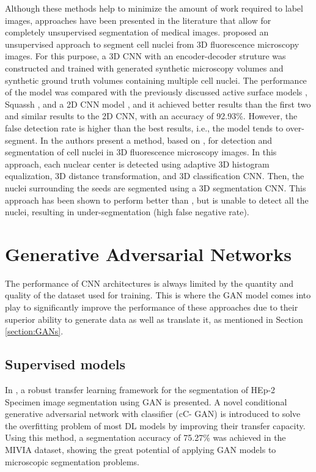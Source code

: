 Although these methods help to minimize the amount of work required to label images, approaches have been presented in the literature that allow for completely unsupervised segmentation of medical images. \citet{SOTA:3DCNN} proposed an unsupervised approach to segment cell nuclei from \ac{3D} fluorescence microscopy images. For this purpose, a \ac{3D} \ac{CNN} with an encoder-decoder struture was constructed and trained with generated synthetic microscopy volumes and synthetic ground truth volumes containing multiple cell nuclei. The performance of the model was compared with the previously discussed active surface models \cite{3D:active,active:inhmo}, Squassh \cite{squassh}, and a \ac{2D} \ac{CNN} model \cite{2dplus}, and it achieved better results than the first two and similar results to the \ac{2D} \ac{CNN}, with an accuracy of 92.93\%. However, the false detection rate is higher than the best results, i.e., the model tends to over-segment. In \cite{3d:detection} the authors present a method, based on \cite{SOTA:3DCNN}, for detection and segmentation of cell nuclei in \ac{3D} fluorescence microscopy images. In this approach, each nuclear center is detected using adaptive \ac{3D} histogram equalization, \ac{3D} distance transformation, and \ac{3D} classification \ac{CNN}. Then, the nuclei surrounding the seeds are segmented using a \ac{3D} segmentation \ac{CNN}. This approach has been shown to perform better than \cite{SOTA:3DCNN}, but is unable to detect all the nuclei, resulting in under-segmentation (high false negative rate). 

\section{Generative Adversarial Networks}

The performance of \ac{CNN} architectures is always limited by the quantity and quality of the dataset used for training. This is where the \ac{GAN} model comes into play to significantly improve the performance of these approaches due to their superior ability to generate data as well as translate it, as mentioned in Section \ref{section:GANs}.

\subsection{Supervised models}

In \cite{cCGAN}, a robust transfer learning framework for the segmentation of HEp-2 Specimen image segmentation using \ac{GAN} is presented. A novel conditional generative adversarial network with classifier (cC- GAN) is introduced to solve the overfitting problem of most DL models by improving their transfer capacity. Using this method, a segmentation accuracy of 75.27\% was achieved in the MIVIA dataset, showing the great potential of applying \ac{GAN} models to microscopic segmentation problems.

